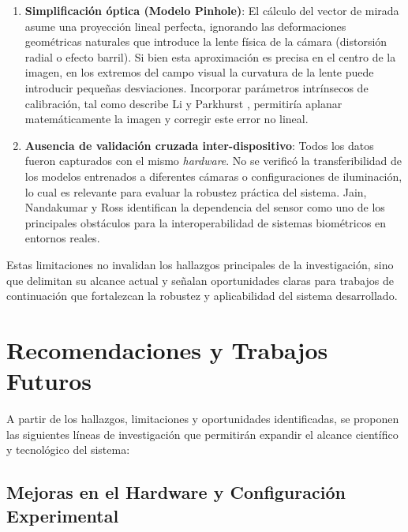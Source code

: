 \begin{enumerate}
	\item \textbf{Simplificación óptica (Modelo Pinhole)}: El cálculo del vector de mirada asume una proyección lineal perfecta, ignorando las deformaciones geométricas naturales que introduce la lente física de la cámara (distorsión radial o efecto barril).
	Si bien esta aproximación es precisa en el centro de la imagen, en los extremos del campo visual la curvatura de la lente puede introducir pequeñas desviaciones.
	Incorporar parámetros intrínsecos de calibración, tal como describe Li y Parkhurst \cite{li2005starburst}, permitiría aplanar matemáticamente la imagen y corregir este error no lineal.
	\item \textbf{Ausencia de validación cruzada inter-dispositivo}: Todos los datos fueron capturados con el mismo \textit{hardware}.
	No se verificó la transferibilidad de los modelos entrenados a diferentes cámaras o configuraciones de iluminación, lo cual es relevante para evaluar la robustez práctica del sistema.
	Jain, Nandakumar y Ross \cite{jain2016biometric} identifican la dependencia del sensor como uno de los principales obstáculos para la interoperabilidad de sistemas biométricos en entornos reales.
\end{enumerate}

Estas limitaciones no invalidan los hallazgos principales de la investigación, sino que delimitan su alcance actual y señalan oportunidades claras para trabajos de continuación que fortalezcan la robustez y aplicabilidad del sistema desarrollado.

\section{Recomendaciones y Trabajos Futuros}

A partir de los hallazgos, limitaciones y oportunidades identificadas, se proponen las siguientes líneas de investigación que permitirán expandir el alcance científico y tecnológico del sistema:

\subsection{Mejoras en el Hardware y Configuración Experimental}

